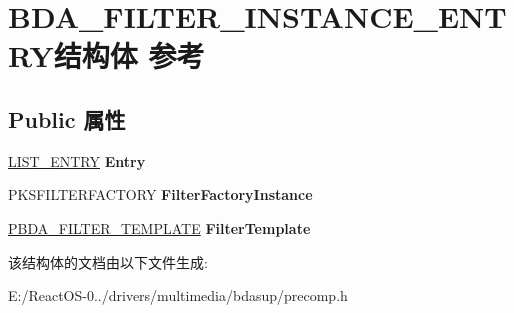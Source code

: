 \hypertarget{struct_b_d_a___f_i_l_t_e_r___i_n_s_t_a_n_c_e___e_n_t_r_y}{}\section{B\+D\+A\+\_\+\+F\+I\+L\+T\+E\+R\+\_\+\+I\+N\+S\+T\+A\+N\+C\+E\+\_\+\+E\+N\+T\+R\+Y结构体 参考}
\label{struct_b_d_a___f_i_l_t_e_r___i_n_s_t_a_n_c_e___e_n_t_r_y}
\subsection*{Public 属性}
\begin{DoxyCompactItemize}
\item 
\mbox{\label{struct_b_d_a___f_i_l_t_e_r___i_n_s_t_a_n_c_e___e_n_t_r_y_a22fb98f2de3273b76e63ec9c6ea2d328}} 
\hyperlink{struct___l_i_s_t___e_n_t_r_y}{L\+I\+S\+T\+\_\+\+E\+N\+T\+RY} {\bfseries Entry}
\item 
\mbox{\label{struct_b_d_a___f_i_l_t_e_r___i_n_s_t_a_n_c_e___e_n_t_r_y_a041d7ef455defea3397e4e3e2e75d96f}} 
P\+K\+S\+F\+I\+L\+T\+E\+R\+F\+A\+C\+T\+O\+RY {\bfseries Filter\+Factory\+Instance}
\item 
\mbox{\label{struct_b_d_a___f_i_l_t_e_r___i_n_s_t_a_n_c_e___e_n_t_r_y_a37474419afdbebb547078e176157c647}} 
\hyperlink{struct___b_d_a___f_i_l_t_e_r___t_e_m_p_l_a_t_e}{P\+B\+D\+A\+\_\+\+F\+I\+L\+T\+E\+R\+\_\+\+T\+E\+M\+P\+L\+A\+TE} {\bfseries Filter\+Template}
\end{DoxyCompactItemize}


该结构体的文档由以下文件生成\+:\begin{DoxyCompactItemize}
\item 
E\+:/\+React\+O\+S-\/0../drivers/multimedia/bdasup/precomp.\+h\end{DoxyCompactItemize}
